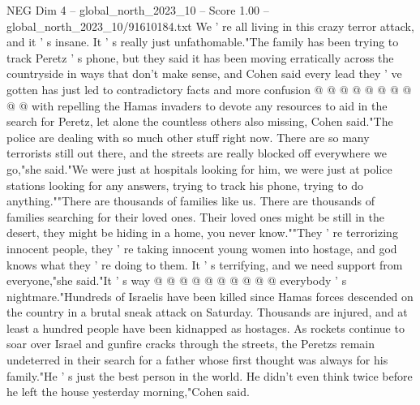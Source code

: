\begin{textsample}{NEG Dim 4 – global\_north\_2023\_10 – Score 1.00 – global\_north\_2023\_10/91610184.txt}
We ' re all living in this crazy terror attack, and it ' s insane.
It ' s really just unfathomable."The family has been trying to track Peretz ' s phone, but they said it has been moving erratically across the countryside in ways that don't make sense, and Cohen said every lead they ' ve gotten has just led to contradictory facts and more confusion @ @ @ @ @ @ @ @ @ @ with repelling the Hamas invaders to devote any resources to aid in the search for Peretz, let alone the countless others also missing, Cohen said."The police are dealing with so much other stuff right now.
There are so many terrorists still out there, and the streets are really blocked off everywhere we go,"she said."We were just at hospitals looking for him, we were just at police stations looking for any answers, trying to track his phone, trying to do anything.""There are thousands of families like us.
There are thousands of families searching for their loved ones.
Their loved ones might be still in the desert, they might be hiding in a home, you never know.""They ' re terrorizing innocent people, they ' re taking innocent young women into hostage, and god knows what they ' re doing to them.
It ' s terrifying, and we need support from everyone,"she said."It ' s way @ @ @ @ @ @ @ @ @ @ everybody ' s nightmare."Hundreds of Israelis have been killed since Hamas forces descended on the country in a brutal sneak attack on Saturday.
Thousands are injured, and at least a hundred people have been kidnapped as hostages.
As rockets continue to soar over Israel and gunfire cracks through the streets, the Peretzs remain undeterred in their search for a father whose first thought was always for his family."He ' s just the best person in the world.
He didn't even think twice before he left the house yesterday morning,"Cohen said.

\end{textsample}

